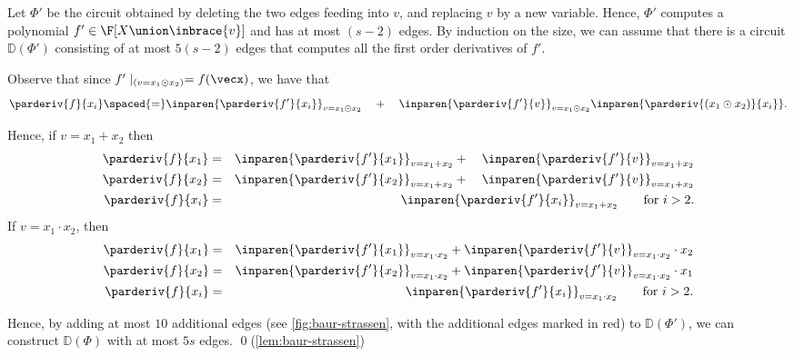 Let $\Phi'$ be the circuit obtained by deleting the two edges feeding into $v$, and replacing $v$ by a new variable. 
Hence, $\Phi'$ computes a polynomial $f' \in \F[X\union \inbrace{v}]$ and has at most $(s-2)$ edges. 
By induction on the size, we can assume that there is a circuit $\mathbb{D}(\Phi')$ consisting of at most $5(s-2)$ edges that computes all the first order derivatives of $f'$.

Observe that since $f'\mid_{(v = x_1 \odot x_2)} = f(\vecx)$,  we have that 
$$
\parderiv{f}{x_i} \spaced{=}\inparen{\parderiv{f'}{x_i}}_{v = x_1 \odot x_2} \quad+\quad  \inparen{\parderiv{f'}{v}}_{v = x_1 \odot x_2}\inparen{\parderiv{(x_1 \odot x_2)}{x_i}}.
$$

Hence, if $v = x_1 + x_2$ then
\begin{eqnarray*}
  \parderiv{f}{x_1} & = & \inparen{\parderiv{f'}{x_1}}_{v=x_1 + x_2} +\quad \inparen{\parderiv{f'}{v}}_{v = x_1 + x_2}\\
  \parderiv{f}{x_2} & = & \inparen{\parderiv{f'}{x_2}}_{v=x_1 + x_2} +\quad \inparen{\parderiv{f'}{v}}_{v = x_1 + x_2}\\
  \parderiv{f}{x_i} & = & \inparen{\parderiv{f'}{x_i}}_{v=x_1 + x_2} \qquad\text{for $i>2$}.
\end{eqnarray*}
If $v = x_1 \cdot x_2$, then
\begin{eqnarray*}
  \parderiv{f}{x_1} & = & \inparen{\parderiv{f'}{x_1}}_{v=x_1 \cdot x_2} + \inparen{\parderiv{f'}{v}}_{v = x_1 \cdot x_2} \cdot x_2\\
  \parderiv{f}{x_2} & = & \inparen{\parderiv{f'}{x_2}}_{v=x_1 \cdot x_2} + \inparen{\parderiv{f'}{v}}_{v = x_1\cdot x_2}\cdot x_1\\
  \parderiv{f}{x_i} & = & \inparen{\parderiv{f'}{x_i}}_{v=x_1 \cdot x_2} \qquad\text{for $i>2$}.
\end{eqnarray*}

Hence, by adding at most $10$ additional edges (see \autoref{fig:baur-strassen}, with the additional edges marked in red) to $\mathbb{D}(\Phi')$, we can construct $\mathbb{D}(\Phi)$ with at most $5s$ edges. \qed (\autoref{lem:baur-strassen})

